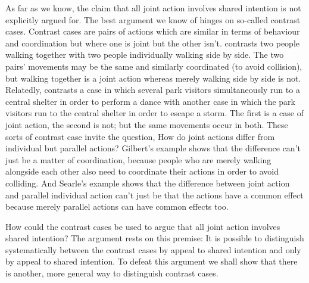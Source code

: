 \documentclass[12pt,\papersize]{extarticle}
\begin{document}
As far as we know, the claim that all joint action involves shared intention is not explicitly argued for.  
The best argument we know of hinges on so-called contrast cases.
Contrast cases are pairs of actions which are similar in terms of behaviour and coordination but where one is joint but the other isn't.  
\citet{gilbert_walking_1990} contrasts two people walking together with two people individually walking side by side.  
The two pairs' movements may be the same and similarly coordinated (to avoid collision), but walking together is a joint action whereas merely walking side by side is not. 
Relatedly,  \citet{Searle:1990em}  contrasts a case in which several park visitors simultaneously run to a central shelter in order to perform a dance with another case in which the park visitors run to the central shelter in order to escape a storm.  The first is a case of joint action, the second is not; but the same movements occur in both.  
These sorts of contrast case invite the question, 
How do joint actions differ from individual but parallel actions? 
Gilbert’s example shows that the difference can’t just be a matter of coordination, because people who are merely walking alongside each other also need to coordinate their actions in order to avoid colliding.  
And Searle’s example shows that the difference between joint action and parallel individual action can’t just be that the actions have a common effect because merely parallel actions can have common effects too. 

How could the contrast cases be used to argue that all joint action involves shared intention?
The argument rests on this premise:
It is possible to distinguish systematically between the contrast cases by appeal to shared intention and only by appeal to shared intention.
To defeat this argument we shall show that there is another, more general way to distinguish contrast cases.
\end{document}
